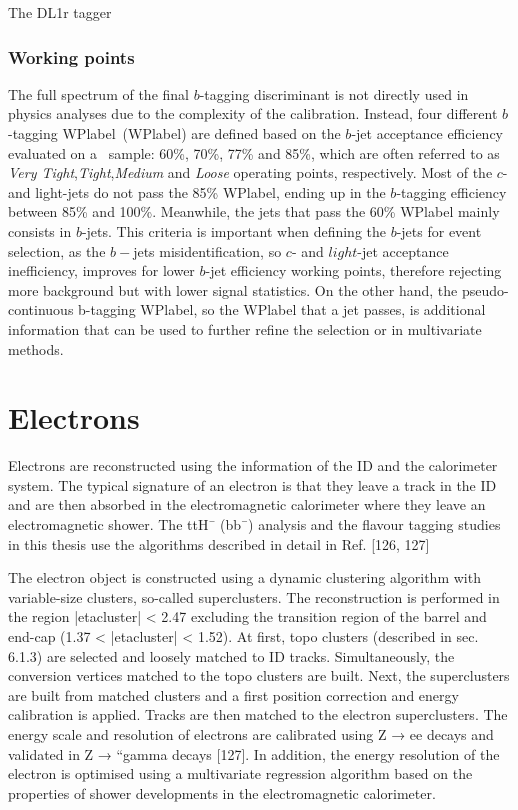 The DL1r tagger



\subsubsection{Working points}

The full spectrum of the final $b$-tagging discriminant is not directly used in physics analyses due to the complexity of the calibration. Instead, four different $b$-tagging \acrlong{WPlabel}~(\acrshort{WPlabel}) are defined based on the $b$-jet acceptance efficiency evaluated on a \ttbar\ sample: 60\%, 70\%, 77\% and 85\%, which are often referred to as \textit{Very Tight},\textit{Tight},\textit{Medium} and \textit{Loose} operating points, respectively. Most of the $c$- and light-jets do not pass the 85\% \acrshort{WPlabel}, ending up in the $b$-tagging efficiency between 85\% and 100\%. Meanwhile, the jets that pass the 60\% \acrshort{WPlabel} mainly consists in $b$-jets. This criteria is important when defining the $b$-jets for event selection, as the $b-$jets misidentification, so $c$- and $light$-jet acceptance inefficiency, improves for lower $b$-jet efficiency working points, therefore rejecting more background but with lower signal statistics. On the other hand, the pseudo-continuous b-tagging \acrshort{WPlabel}, so the \acrshort{WPlabel} that a jet passes, is additional information that can be used to further refine the selection or in multivariate methods.

\section{Electrons}

Electrons are reconstructed using the information of the ID and the calorimeter system. The typical
signature of an electron is that they leave a track in the ID and are then absorbed in the electromagnetic calorimeter where they leave an electromagnetic shower. The ttH¯ (bb¯) analysis and the flavour
tagging studies in this thesis use the algorithms described in detail in Ref. [126, 127]

The electron object is constructed using a dynamic clustering algorithm with variable-size clusters,
so-called superclusters. The reconstruction is performed in the region |etacluster| < 2.47 excluding the
transition region of the barrel and end-cap (1.37 < |etacluster| < 1.52).
At first, topo clusters (described in sec. 6.1.3) are selected and loosely matched to ID tracks. Simultaneously, the conversion vertices matched to the topo clusters are built. Next, the superclusters are
built from matched clusters and a first position correction and energy calibration is applied. Tracks
are then matched to the electron superclusters. The energy scale and resolution of electrons are
calibrated using Z → ee decays and validated in Z → ``gamma decays [127]. In addition, the energy resolution of the electron is optimised using a multivariate regression algorithm based on the properties
of shower developments in the electromagnetic calorimeter.

